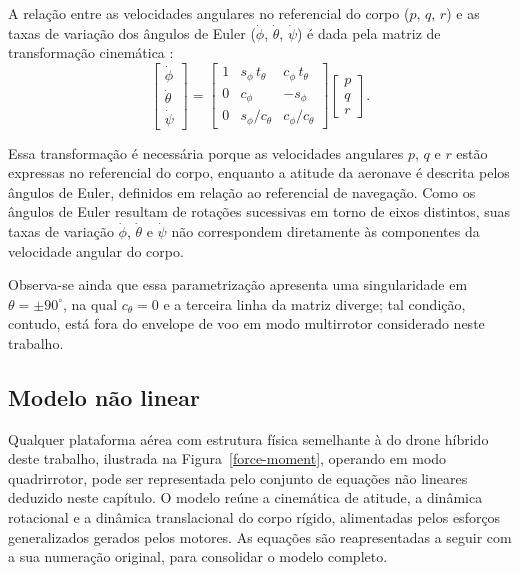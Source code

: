 A relação entre as velocidades angulares no referencial do corpo ($p$, $q$, $r$) e as taxas de variação dos ângulos de Euler ($\dot\phi$, $\dot\theta$, $\dot\psi$) é dada pela matriz de transformação cinemática \cite{Farrell2008}:
\begin{equation}
  \begin{bmatrix} \dot{\phi} \\ \dot{\theta} \\ \dot{\psi} \end{bmatrix}
  =
  \begin{bmatrix}
      1 & s_\phi\,t_\theta & c_\phi\,t_\theta \\[2pt]
      0 & c_\phi & -s_\phi \\[2pt]
      0 & s_\phi/c_\theta & c_\phi/c_\theta
  \end{bmatrix}
  \begin{bmatrix} p \\ q \\ r \end{bmatrix}.
  \label{eq:euler-kinematic}
\end{equation}

Essa transformação é necessária porque as velocidades angulares $p$, $q$ e $r$ estão expressas no referencial do corpo, enquanto a atitude da aeronave é descrita pelos ângulos de Euler, definidos em relação ao referencial de navegação. Como os ângulos de Euler resultam de rotações sucessivas em torno de eixos distintos, suas taxas de variação $\dot\phi$, $\dot\theta$ e $\dot\psi$ não correspondem diretamente às componentes da velocidade angular do corpo.

Observa-se ainda que essa parametrização apresenta uma singularidade em $\theta = \pm 90^\circ$, na qual $c_\theta = 0$ e a terceira linha da matriz diverge; tal condição, contudo, está fora do envelope de voo em modo multirrotor considerado neste trabalho.

\subsection{Modelo não linear}

Qualquer plataforma aérea com estrutura física semelhante à do drone híbrido deste trabalho, ilustrada na Figura~\ref{force-moment}, operando em modo quadrirrotor, pode ser representada pelo conjunto de equações não lineares deduzido neste capítulo. O modelo reúne a cinemática de atitude, a dinâmica rotacional e a dinâmica translacional do corpo rígido, alimentadas pelos esforços generalizados gerados pelos motores. As equações são reapresentadas a seguir com a sua numeração original, para consolidar o modelo completo.

